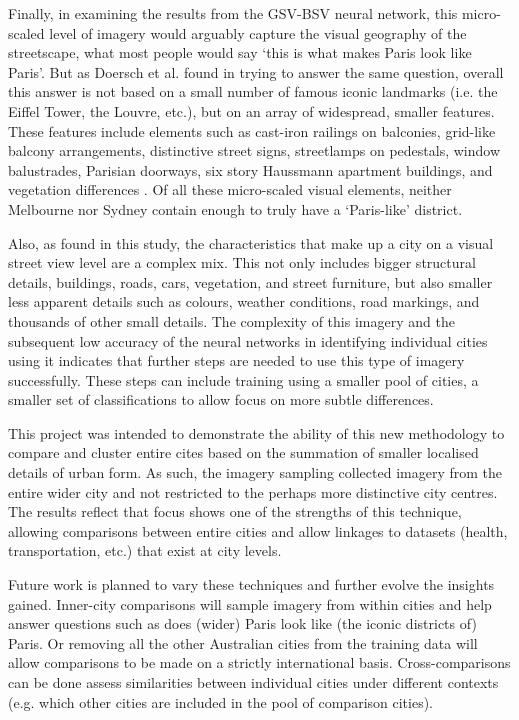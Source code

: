 \documentclass[Crown,sageh,times]{sagej}
\begin{document}
Finally, in examining the results from the GSV-BSV neural network, this micro-scaled level of imagery would arguably capture the visual geography of the streetscape, what most people would say `this is what makes Paris look like Paris'. But as Doersch et al. \cite{Doersch2012} found in trying to answer the same question, overall this answer is not based on a small number of famous iconic landmarks (i.e. the Eiffel Tower, the Louvre, etc.), but on an array of widespread, smaller features. These features include elements such as cast-iron railings on balconies, grid-like balcony arrangements, distinctive street signs, streetlamps on pedestals, window balustrades, Parisian doorways,  six story Haussmann apartment buildings, and vegetation differences \cite{Li2015}. Of all these micro-scaled visual elements, neither Melbourne nor Sydney contain enough to truly have a `Paris-like' district.

Also, as found in this study, the characteristics that make up a city on a visual street view level are a complex mix. This not only includes bigger structural details, buildings, roads, cars, vegetation, and street furniture, but also smaller less apparent details such as colours, weather conditions, road markings, and thousands of other small details. The complexity of this imagery and the subsequent low accuracy of the neural networks in identifying individual cities using it indicates that further steps are needed to use this type of imagery successfully. These steps can include training using a smaller pool of cities, a smaller set of classifications to allow focus on more subtle differences.

This project was intended to demonstrate the ability of this new methodology to compare and cluster entire cites based on the summation of smaller localised details of urban form. As such, the imagery sampling collected imagery from the entire wider city and not restricted to the perhaps more distinctive city centres. The results reflect that focus shows one of the strengths of this technique, allowing comparisons between entire cities and allow linkages to datasets (health, transportation, etc.) that exist at city levels.

Future work is planned to vary these techniques and further evolve the insights gained. Inner-city comparisons will sample imagery from within cities and help answer questions such as does (wider) Paris look like (the iconic districts of) Paris. Or removing all the other Australian cities from the training data will allow comparisons to be made on a strictly international basis. Cross-comparisons can be done assess similarities between individual cities under different contexts (e.g. which other cities are included in the pool of comparison cities). 
\end{document}
